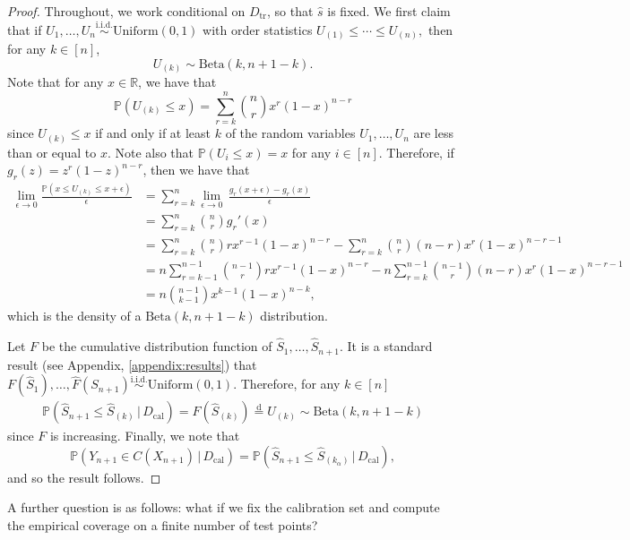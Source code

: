 \documentclass[11pt, titlepage]{article} %
\newcommand{\R}{\mathrm}
\newcommand{\Prob}[1]{\mathbb{P}\left( #1 \right)}
\numberwithin{equation}{section}
\theoremstyle{definition}
\numberwithin{theorem}{section}
\numberwithin{lemma}{section}
\numberwithin{corollary}{section}
\numberwithin{proposition}{section}
\numberwithin{definition}{section}
\numberwithin{remark}{section}
\begin{document}
\begin{proof}
    Throughout, we work conditional on \(D_\R{tr}\), so that \(\hat{s}\) is fixed. We first claim that if \(U_1, \ldots, U_n \overset{\R{i.i.d.}}{\sim} \R{Uniform}(0,1)\) with order statistics \(U_{(1)} \leq \cdots \leq U_{(n)}, \) then for any \(k \in [n]\), \[U_{(k)} \sim \R{Beta}(k, n+1-k).\] Note that for any \(x \in \mathbb{R}\), we have that \[\Prob{U_{(k)} \leq x} = \sum_{r=k}^{n} \binom{n}{r} x^r (1-x)^{n-r}\] since \(U_{(k)} \leq x\) if and only if at least \(k\) of the random variables \(U_1, \ldots, U_n\) are less than or equal to \(x\). Note also that \(\Prob{U_i \leq x} = x\) for any \(i \in [n]\). Therefore, if \(g_r(z) = z^r (1-z)^{n-r}\), then we have that \begin{align*}
        \lim_{\epsilon \to 0} \frac{\Prob{x \leq U_{(k)} \leq x+\epsilon}}{\epsilon} &= \sum_{r=k}^{n} \lim_{\epsilon \to 0} \, \frac{g_r(x+\epsilon) - g_r(x)}{\epsilon} \\
        &= \sum_{r=k}^{n} \binom{n}{r} g_r'(x) \\
        &= \sum_{r=k}^{n} \binom{n}{r} r x^{r-1}(1-x)^{n-r} - \sum_{r=k}^{n} \binom{n}{r} (n-r) x^{r}(1-x)^{n-r-1} \\
        &= n \sum_{r=k-1}^{n-1} \binom{n-1}{r} r x^{r-1}(1-x)^{n-r} -  n \sum_{r=k}^{n-1} \binom{n-1}{r} (n-r) x^{r}(1-x)^{n-r-1} \\
        &= n \binom{n-1}{k-1} x^{k-1}(1-x)^{n-k},
    \end{align*}
    which is the density of a \(\R{Beta}(k, n+1-k)\) distribution. \vskip5pt

    \noindent
    Let \(F\) be the cumulative distribution function of \(\hat{S}_1, \ldots, \hat{S}_{n+1}.\) It is a standard result (see Appendix, \cref{appendix:results}) that \(F(\hat{S}_1), \ldots, \hat{F}(S_{n+1}) \overset{\R{i.i.d.}}{\sim} \R{Uniform}(0,1).\) Therefore, for any \(k \in [n]\) \begin{align*}
        \Prob{\hat{S}_{n+1} \leq \hat{S}_{(k)} \, | \, D_\R{cal}} = F(\hat{S}_{(k)}) \overset{\R{d}}{=} U_{(k)} \sim \R{Beta}(k, n+1-k)
    \end{align*} since \(F\) is increasing. Finally, we note that \[\Prob{Y_{n+1} \in C(X_{n+1}) \, | \, D_\R{cal}} = \Prob{\hat{S}_{n+1} \leq \hat{S}_{(k_\alpha)} \, | \, D_\R{cal}}, \] and so the result follows.
\end{proof}

\noindent
A further question is as follows: what if we fix the calibration set and compute the empirical coverage on a finite number of test points? \vskip5pt
\end{document}
